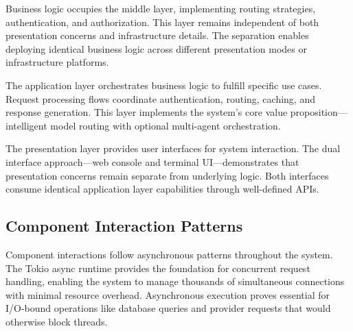 \documentclass[12pt,a4paper,twoside]{report}
\begin{document}
Business logic occupies the middle layer, implementing routing strategies, authentication, and authorization. This layer remains independent of both presentation concerns and infrastructure details. The separation enables deploying identical business logic across different presentation modes or infrastructure platforms.

The application layer orchestrates business logic to fulfill specific use cases. Request processing flows coordinate authentication, routing, caching, and response generation. This layer implements the system's core value proposition—intelligent model routing with optional multi-agent orchestration.

The presentation layer provides user interfaces for system interaction. The dual interface approach—web console and terminal UI—demonstrates that presentation concerns remain separate from underlying logic. Both interfaces consume identical application layer capabilities through well-defined APIs.

\subsection{Component Interaction Patterns}

Component interactions follow asynchronous patterns throughout the system. The Tokio async runtime provides the foundation for concurrent request handling, enabling the system to manage thousands of simultaneous connections with minimal resource overhead. Asynchronous execution proves essential for I/O-bound operations like database queries and provider requests that would otherwise block threads.
\end{document}
